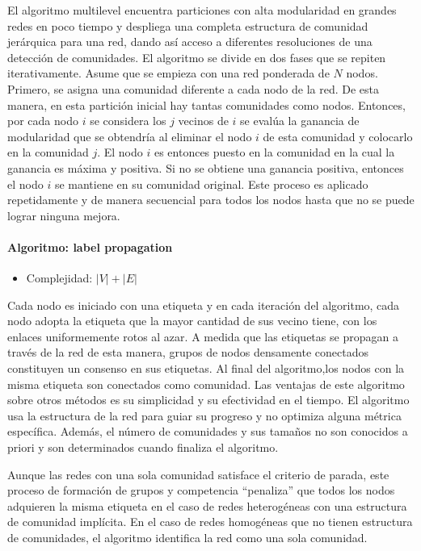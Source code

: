 El algoritmo multilevel encuentra particiones con alta modularidad en grandes redes en poco tiempo y despliega una completa estructura de comunidad jerárquica para una red, dando así acceso a diferentes resoluciones de una detección de comunidades. El algoritmo se divide en dos fases que se repiten iterativamente. Asume que se empieza con una red ponderada de $N$ nodos. Primero, se asigna una comunidad diferente a cada nodo de la red. De esta manera, en esta partición inicial hay tantas comunidades como nodos. Entonces, por cada nodo $i$ se considera los $j$ vecinos de $i$ se evalúa la ganancia de modularidad que se obtendría al eliminar el nodo $i$ de esta comunidad y colocarlo en la comunidad $j$. El nodo $i$ es entonces puesto en la comunidad en la cual la ganancia es máxima y positiva. Si no se obtiene una ganancia positiva, entonces el nodo $i$ se mantiene en su comunidad original. Este proceso es aplicado repetidamente y de manera secuencial para todos los nodos hasta que no se puede lograr ninguna mejora.
 
\paragraph{Algoritmo: label propagation}\cite{Raghavan2007NearNetworks.}
\begin{itemize}
\item Complejidad: $|V| + |E|$
\end{itemize}
Cada nodo es iniciado con una etiqueta y en cada iteración del algoritmo, cada nodo adopta la etiqueta que la mayor cantidad de sus vecino tiene, con los enlaces uniformemente rotos al azar. A medida que las etiquetas se propagan a través de la red de esta manera, grupos de nodos densamente conectados constituyen un consenso en sus etiquetas. Al final del algoritmo,los nodos con la misma etiqueta son conectados como comunidad. Las ventajas de este algoritmo sobre otros métodos es su simplicidad y su efectividad en el tiempo. El algoritmo usa la estructura de la red para guiar su progreso y no optimiza alguna métrica específica. Además, el número de comunidades y sus tamaños no son conocidos a priori y son determinados cuando finaliza el algoritmo.
 
Aunque las redes con una sola comunidad satisface el criterio de parada, este proceso de formación de grupos y competencia “penaliza” que todos los nodos adquieren la misma etiqueta en el caso de redes heterogéneas con una estructura de comunidad implícita. En el caso de redes homogéneas que no tienen estructura de comunidades, el algoritmo identifica la red como una sola comunidad.

